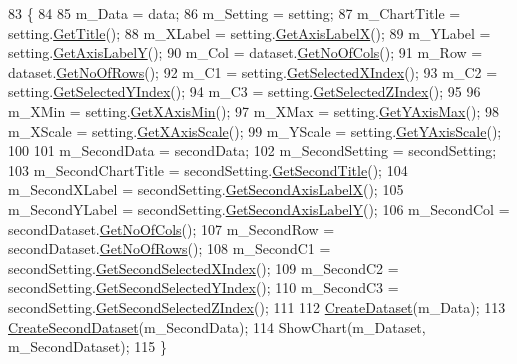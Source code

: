\begin{DoxyCode}
83                                           \{
84 
85         m\_Data = data;
86         m\_Setting = setting;
87         m\_ChartTitle = setting.\hyperlink{class_data_attribute_ade9747a192ba22fe1020e874bff6a48c}{GetTitle}();
88         m\_XLabel = setting.\hyperlink{class_data_attribute_aecb451704a87d77dd80dbad8a19099d1}{GetAxisLabelX}();
89         m\_YLabel = setting.\hyperlink{class_data_attribute_af5f68794cd0195d42135d5e48120ccc0}{GetAxisLabelY}();
90         m\_Col = dataset.\hyperlink{class_dataset_ab922bef50c8aa1531de8704731779246}{GetNoOfCols}();
91         m\_Row = dataset.\hyperlink{class_dataset_a91257a605317576e87e1c32e54739e51}{GetNoOfRows}();
92         m\_C1 = setting.\hyperlink{class_data_attribute_a0f4a54973bc44b0526f78bda945dc81b}{GetSelectedXIndex}();
93         m\_C2 = setting.\hyperlink{class_data_attribute_a82e7519853d9f470ea183dd0c39a03d6}{GetSelectedYIndex}();
94         m\_C3 = setting.\hyperlink{class_data_attribute_a802ca8ea739cff583380ea27647250c7}{GetSelectedZIndex}();
95         
96         m\_XMin = setting.\hyperlink{class_data_attribute_afa9da883abc4abad5f64c045de114c50}{GetXAxisMin}();
97         m\_XMax = setting.\hyperlink{class_data_attribute_a81243eb8f7008e05e74b0f3571d2f08d}{GetYAxisMax}();
98         m\_XScale = setting.\hyperlink{class_data_attribute_a5a1de25600487aa958a19ce01151fea4}{GetXAxisScale}();
99         m\_YScale = setting.\hyperlink{class_data_attribute_a95259727ce91efc0e0eaa28487d944c5}{GetYAxisScale}();
100         
101         m\_SecondData = secondData;
102         m\_SecondSetting = secondSetting;
103         m\_SecondChartTitle = secondSetting.\hyperlink{class_data_attribute_a4079522c93025fce7569eaed585f4aeb}{GetSecondTitle}();
104         m\_SecondXLabel = secondSetting.\hyperlink{class_data_attribute_a8ace4cb1fee9e2abeabe3efc9a190c8f}{GetSecondAxisLabelX}();
105         m\_SecondYLabel = secondSetting.\hyperlink{class_data_attribute_a6efb7e067317898feefbbf6bd472b998}{GetSecondAxisLabelY}();
106         m\_SecondCol = secondDataset.\hyperlink{class_dataset_ab922bef50c8aa1531de8704731779246}{GetNoOfCols}();
107         m\_SecondRow = secondDataset.\hyperlink{class_dataset_a91257a605317576e87e1c32e54739e51}{GetNoOfRows}();
108         m\_SecondC1 = secondSetting.\hyperlink{class_data_attribute_a7f501790eee650ddf9ac17c4f63a3995}{GetSecondSelectedXIndex}();
109         m\_SecondC2 = secondSetting.\hyperlink{class_data_attribute_a6f61ad05915f4aa31ad3dba00596da64}{GetSecondSelectedYIndex}();
110         m\_SecondC3 = secondSetting.\hyperlink{class_data_attribute_ab8aad538c86b04b4b9a962b7e07e6bc3}{GetSecondSelectedZIndex}();
111         
112          \hyperlink{class_bubble_chart_a29cb4d22e401dd9f621501356cd1ebaf}{CreateDataset}(m\_Data);
113          \hyperlink{class_bubble_chart_a69a32c69ec1225221e9daf6488d284d3}{CreateSecondDataset}(m\_SecondData);
114          ShowChart(m\_Dataset, m\_SecondDataset);
115     \} 
\end{DoxyCode}

